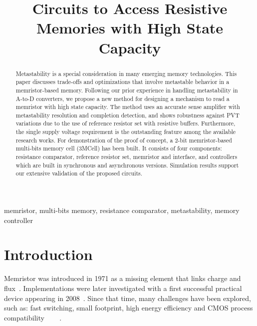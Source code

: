 \documentclass[twocolumn,conference]{IEEEtran}
\begin{document}
\title{Circuits to Access Resistive Memories with High State Capacity}

\maketitle

\begin{abstract}
Metastability is a special consideration in many emerging memory technologies. This paper discusses trade-offs and optimizations that involve metastable behavior in a memristor-based memory. Following our prior experience in handling metastability in A-to-D converters, we propose a new method for designing a mechanism to read a memristor with high state capacity. The method uses an accurate sense amplifier with metastability resolution and completion detection, and shows robustness against PVT variations due to the use of reference resistor set with resistive buffers. Furthermore, the single supply voltage requirement is the outstanding feature among the available research works.  For demonstration of the proof of concept, a 2-bit memristor-based multi-bits memory cell (3MCell) has been built. It consists of four components: resistance comparator, reference resistor set, memristor and interface, and controllers which are built in synchronous and asynchronous versions. Simulation results support our extensive validation of the proposed circuits.

\end{abstract}

\begin{IEEEkeywords}
memristor, multi-bits memory, resistance comparator, metastability, memory controller
\end{IEEEkeywords}

\section{Introduction}
\label{sec:introduction}
Memristor was introduced in 1971 as a missing element that links charge and flux~\cite{Chua-1971-TCT}. Implementations were later investigated with a first successful practical device appearing in 2008~\cite{Strukov-2008-Nature}. Since that time, many challenges have been explored, such as: fast switching, small footprint, high energy efficiency and CMOS process compatibility~\cite{Vourkas-2016-MCAS} ~\cite{Vourkas-2016-Springer} ~\cite{Sacchetto-2013-MCAS}.
\end{document}
